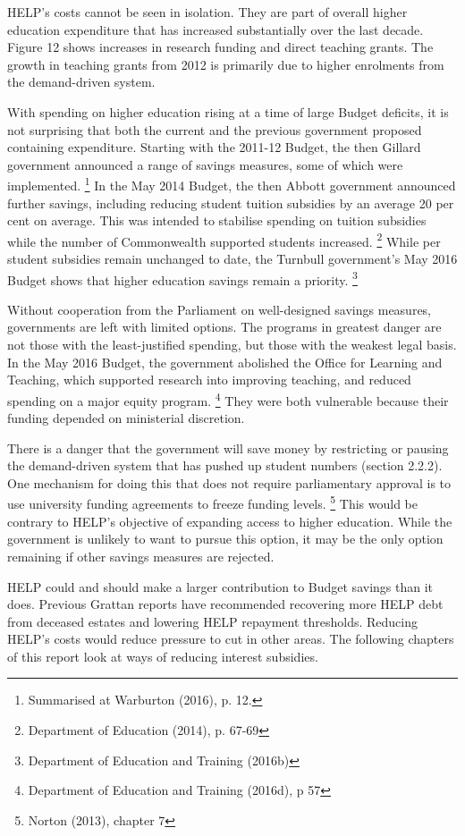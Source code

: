 \documentclass[embargoed]{grattan}
\begin{document}
HELP's costs cannot be seen in isolation.
They are part of overall higher education expenditure that has increased substantially over the last decade.
Figure 12 shows increases in research funding and direct teaching grants.
The growth in teaching grants from 2012 is primarily due to higher enrolments from the demand-driven system.

With spending on higher education rising at a time of large Budget deficits, it is not surprising that both the current and the previous government proposed containing expenditure.
Starting with the 2011-12 Budget, the then Gillard government announced a range of savings measures, some of which were implemented.%
\footnote{Summarised at Warburton (2016), p. 12.} In the May 2014 Budget, the then Abbott government announced further savings, including reducing student tuition subsidies by an average 20 per cent on average.
This was intended to stabilise spending on tuition subsidies while the number of Commonwealth supported students increased.%
\footnote{Department of Education (2014), p. 67-69} While per student subsidies remain unchanged to date, the Turnbull government's May 2016 Budget shows that higher education savings remain a priority.%
\footnote{Department of Education and Training (2016b)}

Without cooperation from the Parliament on well-designed savings measures, governments are left with limited options.
The programs in greatest danger are not those with the least-justified spending, but those with the weakest legal basis.
In the May 2016 Budget, the government abolished the Office for Learning and Teaching, which supported research into improving teaching, and reduced spending on a major equity program.%
\footnote{Department of Education and Training (2016d), p 57} They were both vulnerable because their funding depended on ministerial discretion.

There is a danger that the government will save money by restricting or pausing the demand-driven system that has pushed up student numbers (section 2.2.2).
One mechanism for doing this that does not require parliamentary approval is to use university funding agreements to freeze funding levels.%
\footnote{Norton (2013), chapter 7} This would be contrary to HELP's objective of expanding access to higher education.
While the government is unlikely to want to pursue this option, it may be the only option remaining if other savings measures are rejected.

HELP could and should make a larger contribution to Budget savings than it does.
Previous Grattan reports have recommended recovering more HELP debt from deceased estates and lowering HELP repayment thresholds.
Reducing HELP's costs would reduce pressure to cut in other areas.
The following chapters of this report look at ways of reducing interest subsidies.
\end{document}
